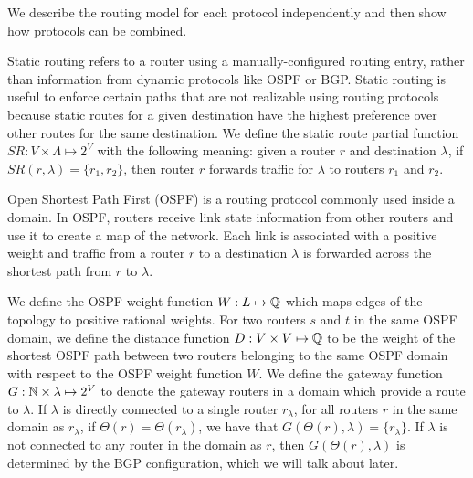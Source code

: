 We describe
the routing model for each protocol independently
and then show how protocols can be combined. 



 Static routing refers to a router using a
manually-configured routing entry, rather than information from
dynamic protocols like OSPF or BGP.  Static routing is useful to enforce certain
paths that are not realizable using routing protocols because 
static
routes for a given destination have the highest preference over other routes for the same destination.  
We define the static route partial
function $SR: V \times \Lambda \mapsto 2^V$ with the following meaning:  
given a router $r$
and destination $\lambda$, if $SR(r,\lambda)=\{r_1, r_2\}$, then router
$r$ forwards traffic for $\lambda$ to routers 
$r_1$ and $r_2$.    

 Open Shortest Path First (OSPF) is a routing
protocol commonly used inside a domain. In OSPF, routers receive link
state information from other routers and use it to create a map of
the network. Each link is associated with a positive weight and traffic from a router $r$ to
a destination $\lambda$ is forwarded across 
the shortest path from $r$ to $\lambda$.

We define the OSPF weight function $W: L \mapsto \mathbb{Q}$ which 
maps edges of the topology to positive rational weights.  
For two routers $s$ and $t$ in the same OSPF domain, 
we define the distance function $D:V \times V \mapsto \mathbb{Q}$ 
to be the weight of the shortest OSPF path between two routers
belonging to the same OSPF domain with respect to the  
OSPF weight function $W$.
We define the gateway function 
$G: \mathbb{N} \times \lambda \mapsto 2^V$ to denote the gateway routers 
in a domain which provide a route to $\lambda$. If $\lambda$ 
is directly connected to a single router $r_\lambda$, for all routers $r$ in the 
same domain as $r_\lambda$,
if 
$\Theta(r) = \Theta(r_\lambda)$, we have that $G(\Theta(r), \lambda) = \{r_\lambda\}$.
If $\lambda$ is not connected
to any router in the domain as $r$, then $G(\Theta(r),\lambda)$ is 
determined by the BGP configuration, which we will talk about later. 


